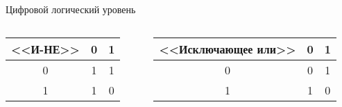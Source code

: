 \documentclass[aspectratio=169,14pt]{beamer}
\begin{document}
\begin{frame}{Цифровой логический уровень}
\begin{itemize}
\begin{small}
\begin{columns}[T,onlytextwidth]
        \end{columns}
        \begin{columns}[T,onlytextwidth]
            \begin{column}{0.5\textwidth}
                \begin{table}
                    \centering
                    \begin{tabular}{c|cc}
                        \textbf{<<И-НЕ>>} & 0 & 1 \\ \hline
                        0 & 1 & 1 \\
                        1 & 1 & 0
                    \end{tabular}
                \end{table}
            \end{column}
            \begin{column}{0.5\textwidth}
                \begin{table}
                    \centering
                    \begin{tabular}{c|cc}
                        \textbf{<<Исключающее или>>} & 0 & 1 \\ \hline
                        0 & 0 & 1 \\
                        1 & 1 & 0
                    \end{tabular}
                \end{table}
            \end{column}
        \end{columns}
        \end{small}
    \end{itemize}
\end{frame}
\end{document}
